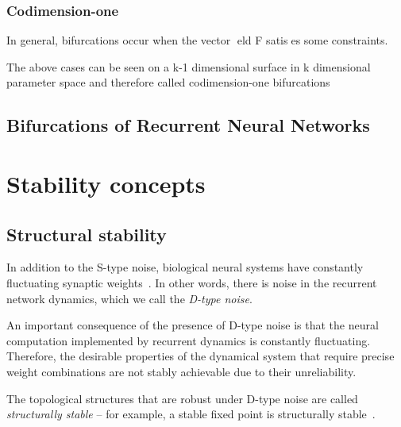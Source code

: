 \documentclass{article}
\theoremstyle{definition}
\theoremstyle{remark}
\begin{document}
\subsubsection{Codimension-one}

In general, bifurcations occur when the vector eld F satises some constraints.

 The above cases can be seen on a k-1 dimensional surface in k dimensional parameter space and therefore called codimension-one bifurcations


\subsection{Bifurcations of Recurrent Neural Networks}
\citep{doyaBifurcationsRecurrentNeural}



\section{Stability concepts}



\subsection{Structural stability}
In addition to the S-type noise, biological neural systems have constantly fluctuating synaptic weights~\cite{Shimizu2021}.
In other words, there is noise in the recurrent network dynamics, which we call the \emph{D-type noise}.

An important consequence of the presence of D-type noise is that the neural computation implemented by recurrent dynamics is constantly fluctuating.
Therefore, the desirable properties of the dynamical system that require precise weight combinations are not stably achievable due to their unreliability.

The topological structures that are robust under D-type noise are called \emph{structurally stable} -- for example, a stable fixed point is structurally stable~\cite{Kuznetsov1995}.
\end{document}
